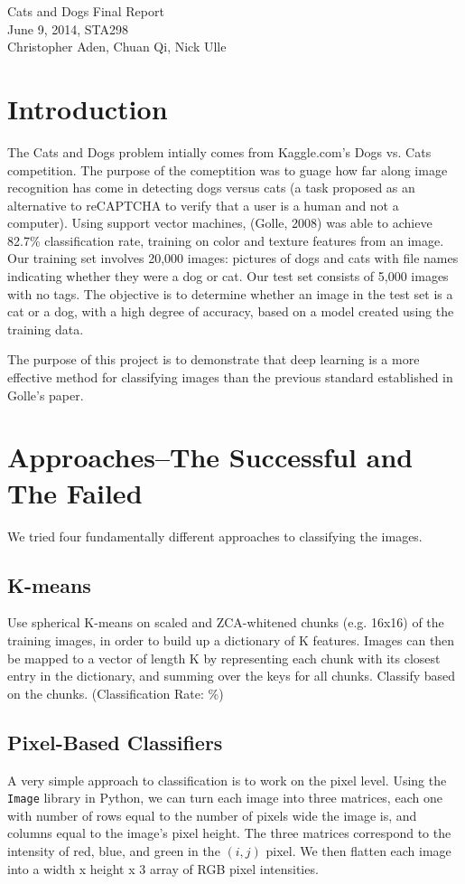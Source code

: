 \documentclass[12pt]{article}
\begin{document}
\begin{center}
Cats and Dogs Final Report\\
June 9, 2014, STA298\\
Christopher Aden, Chuan Qi, Nick Ulle\\
\end{center}

\section{Introduction}
The Cats and Dogs problem intially comes from Kaggle.com's Dogs vs. Cats competition. The purpose of the comeptition was to guage how far along image recognition has come in detecting dogs versus cats (a task proposed as an alternative to reCAPTCHA to verify that a user is a human and not a computer). Using support vector machines, (Golle, 2008) was able to achieve 82.7\% classification rate, training on color and texture features from an image. Our training set involves 20,000 images: pictures of dogs and cats with file names indicating whether they were a dog or cat. Our test set consists of 5,000 images with no tags. The objective is to determine whether an image in the test set is a cat or a dog, with a high degree of accuracy, based on a model created using the training data.

The purpose of this project is to demonstrate that deep learning is a more effective method for classifying images than the previous standard established in Golle's paper. 

\section{Approaches--The Successful and The Failed}
We tried four fundamentally different approaches to classifying the images.

\subsection{K-means}
Use spherical K-means on scaled and ZCA-whitened chunks (e.g. 16x16) of the training images, in order to build up a dictionary of K features. Images can then be mapped to a vector of length K by representing each chunk with its closest entry in the dictionary, and summing over the keys for all chunks. Classify based on the chunks. (Classification Rate: \%)

\subsection{Pixel-Based Classifiers}
A very simple approach to classification is to work on the pixel level. Using the \verb+Image+ library in Python, we can turn each image into three matrices, each one with number of rows equal to the number of pixels wide the image is, and columns equal to the image's pixel height. The three matrices correspond to the intensity of red, blue, and green in the $(i,j)$ pixel. We then flatten each image into a width x height x 3 array of RGB pixel intensities. 
\end{document}

